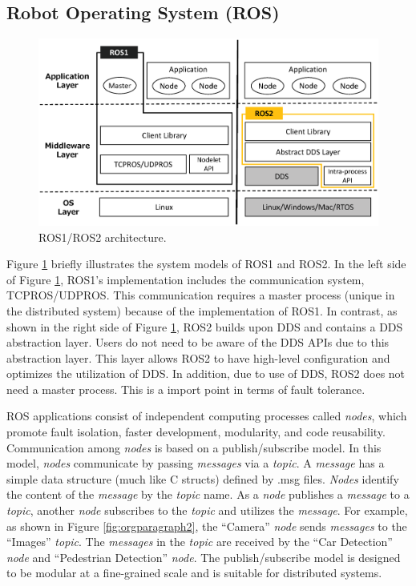 \documentclass{sig-alternate-05-2015}
\begin{document}
\subsection{Robot Operating System (ROS)}
\label{sec:orgheadline6}

\begin{figure}[t]
\centering
\includegraphics[width=1.0\linewidth]{../figure/ros_architecture.eps}
\vspace{-8mm}
\caption{\label{fig:orgparagraph1}
ROS1/ROS2 architecture.}
\vspace{-5mm}
\end{figure}   

Figure \ref{fig:orgparagraph1} briefly illustrates the system models of ROS1 and ROS2. 
In the left side of Figure \ref{fig:orgparagraph1}, ROS1's implementation includes the communication system, TCPROS/UDPROS. 
This communication requires a master process (unique in the distributed system) because of the implementation of ROS1.
In contrast, as shown in the right side of Figure \ref{fig:orgparagraph1}, ROS2 builds upon DDS and contains a DDS abstraction layer. 
Users do not need to be aware of the DDS APIs due to this abstraction layer.
This layer allows ROS2 to have high-level configuration and optimizes the utilization of DDS. 
In addition, due to use of DDS, ROS2 does not need a master process.
This is a import point in terms of fault tolerance.

ROS applications consist of independent computing processes called \emph{nodes}, which promote fault isolation, faster development, modularity, and code reusability. 
Communication among \emph{nodes} is based on a publish/subscribe model. 
In this model, \emph{nodes} communicate by passing \emph{messages} via a \emph{topic}. 
A \emph{message} has a simple data structure (much like C structs) defined by .msg files.
\emph{Nodes} identify the content of the \emph{message} by the \emph{topic} name.
As a \emph{node} publishes a \emph{message} to a \emph{topic}, another \emph{node} subscribes to the \emph{topic} and utilizes the \emph{message}. 
For example, as shown in Figure \ref{fig:orgparagraph2}, the ``Camera'' \emph{node} sends \emph{messages} to the ``Images'' \emph{topic}. 
The \emph{messages} in the \emph{topic} are received by the ``Car Detection'' \emph{node}  and ``Pedestrian Detection'' \emph{node}.
The publish/subscribe model is designed to be modular at a fine-grained scale and is suitable for distributed systems.
\end{document}
